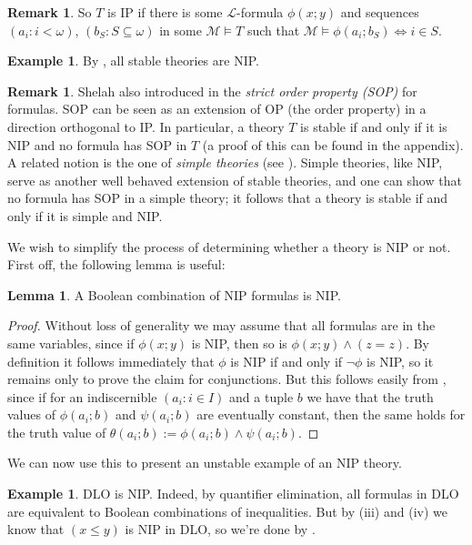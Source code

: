 \documentclass[a4paper]{report}
\newcommand{\ind}{\hspace{15pt}}
\renewcommand{\L}{\mathcal{L}}
\newcommand{\M}{\mathcal{M}}
\renewcommand{\iff}{\Leftrightarrow}
\theoremstyle{definition}
\newtheorem{lem}[thm]{Lemma}
\newtheorem{exmp}[thm]{Example}
\theoremstyle{remstyle}
\newtheorem{rem}[thm]{Remark}
\begin{document}
\begin{rem}
	So $T$ is IP if there is some $\L$-formula $\phi(x;y)$ and sequences $(a_i:i<\omega)$, $(b_S:S\subseteq\omega)$ in some $\M\models T$ such that $\M\models\phi(a_i;b_S)\iff i\in S$.
\end{rem}

\begin{exmp}
	By , all stable theories are NIP.
\end{exmp}

\begin{rem}
	Shelah also introduced in \cite{nip og} the \emph{strict order property (SOP)} for formulas. SOP can be seen as an extension of OP (the order property) in a direction orthogonal to IP. In particular, a theory $T$ is stable if and only if it is NIP and no formula has SOP in $T$ (a proof of this can be found in the appendix). A related notion is the one of \emph{simple theories} (see \cite{simple}). Simple theories, like NIP, serve as another well behaved extension of stable theories, and one can show that no formula has SOP in a simple theory; it follows that a theory is stable if and only if it is simple and NIP.
\end{rem}

\ind We wish to simplify the process of determining whether a theory is NIP or not. First off, the following lemma is useful:

\begin{lem}\label{boolean}
	A Boolean combination of NIP formulas is NIP.
\end{lem}

\begin{proof}
	Without loss of generality we may assume that all formulas are in the same variables, since if $\phi(x;y)$ is NIP, then so is $\phi(x;y)\wedge(z=z)$. By definition it follows immediately that $\phi$ is NIP if and only if $\neg\phi$ is NIP, so it remains only to prove the claim for conjunctions. But this follows easily from , since if for an indiscernible $(a_i:i\in I)$ and a tuple $b$ we have that the truth values of $\phi(a_i;b)$ and $\psi(a_i;b)$ are eventually constant, then the same holds for the truth value of $\theta(a_i;b):=\phi(a_i;b)\wedge\psi(a_i;b)$.
\end{proof}

\ind We can now use this to present an unstable example of an NIP theory.

\begin{exmp}\label{DLOnip}
	DLO is NIP. Indeed, by quantifier elimination, all formulas in DLO are equivalent to Boolean combinations of inequalities. But by  (iii) and (iv) we know that $(x\leq y)$ is NIP in DLO, so we're done by .
\end{exmp}
\end{document}

